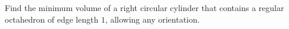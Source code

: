 Find the minimum volume of a right circular cylinder that contains a regular octahedron of edge length $1$, allowing any orientation.
